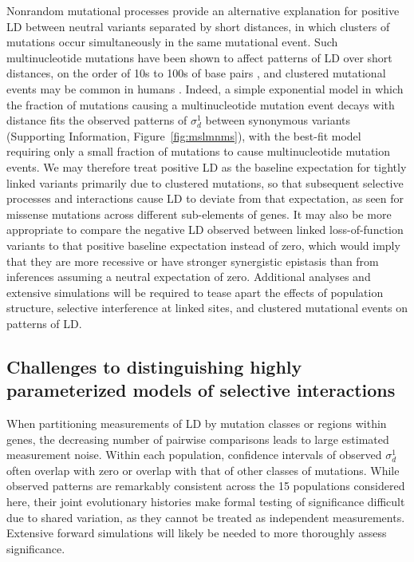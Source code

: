 \documentclass[]{article}
\begin{document}
Nonrandom mutational processes provide an alternative explanation for positive
LD between neutral variants separated by short distances, in which clusters of
mutations occur simultaneously in the same mutational event. Such
multinucleotide mutations have been shown to affect patterns of LD over short
distances, on the order of 10s to 100s of base pairs \citep{Harris2014-zg}, and
clustered mutational events may be common in humans \citep{Besenbacher2016-ac}.
Indeed, a simple exponential model in which the fraction of mutations causing a
multinucleotide mutation event decays with distance fits the observed patterns
of \(\sigma_d^1\) between synonymous variants (Supporting Information,
Figure~\ref{fig:mslmnms}), with the best-fit model requiring only a small
fraction of mutations to cause multinucleotide mutation events. We may
therefore treat positive LD as the baseline expectation for tightly linked
variants primarily due to clustered mutations, so that subsequent selective
processes and interactions cause LD to deviate from that expectation, as seen
for missense mutations across different sub-elements of genes. It may also be
more appropriate to compare the negative LD observed between linked
loss-of-function variants to that positive baseline expectation instead of
zero, which would imply that they are more recessive or have stronger
synergistic epistasis than from inferences assuming a neutral expectation of
zero. Additional analyses and extensive simulations will be required to tease
apart the effects of population structure, selective interference at linked
sites, and clustered mutational events on patterns of LD.

\subsection{Challenges to distinguishing highly parameterized models of selective interactions}

When partitioning measurements of LD by mutation classes or regions within
genes, the decreasing number of pairwise comparisons leads to large estimated
measurement noise. Within each population, confidence intervals of observed
\(\sigma_d^1\) often overlap with zero or overlap with that of other classes of
mutations. While observed patterns are remarkably consistent across the 15
populations considered here, their joint evolutionary histories make formal
testing of significance difficult due to shared variation, as they cannot be
treated as independent measurements. Extensive forward simulations will likely
be needed to more thoroughly assess significance.
\end{document}
